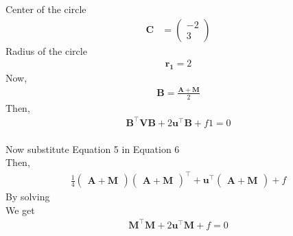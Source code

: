 \documentclass[10pt,a4paper]{report}
\newcommand{\myvec}[1]{\ensuremath{\begin{pmatrix}#1\end{pmatrix}}}
\let\vec\mathbf
\begin{document}
\begin{multicols}{2}
Center of the circle 
\begin{align} 
\vec{C} &= \myvec{-2 \\ 3} 
\end{align}
Radius of the circle
\begin{align}
{\vec{r_1}=2}
\end{align}
Now,
\vspace{0.25cm}\\
\begin{align}
	\vec{B} ={\frac{\vec{A}+\vec{M}}{2} }
\end{align}
Then,
\begin{align}
\vec{B}^{\top}\vec{V}\vec{B}+2\vec{u}^{\top}\vec{B}+f1=0
\end{align}
\vspace{0.25cm}\\
Now substitute Equation 5 in Equation 6
\vspace{0.25cm}\\
Then,
\begin{align}
	\frac{1}{4}\myvec{\vec{A}+\vec{M}}\myvec{\vec{A}+\vec{M}}^{\top}+\vec{u}^{\top}\myvec{\vec{A}+\vec{M}}+f
\end{align}
By solving 
\vspace{0.25cm}\\
We get
\vspace{0.25cm}\\
\begin{align}
\boxed {\vec{M}^{\top}\vec{M}+2\vec{u}^{\top}\vec{M}+f=0}
\end{align}

\end{multicols}
\end{document}
